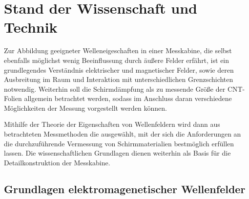 

\chapter{Stand der Wissenschaft und Technik}\label{cha:2}

Zur Abbildung geeigneter Welleneigeschaften in einer Messkabine, die selbst ebenfalls möglichst wenig Beeinflussung durch äußere Felder erfährt, ist ein grundlegendes Verständnis elektrischer und magnetischer Felder, sowie deren Ausbreitung im Raum und Interaktion mit unterschiedlichen Grenzschichten notwendig. Weiterhin soll die Schirmdämpfung als zu messende Größe der CNT-Folien allgemein betrachtet werden, sodass im Anschluss daran verschiedene Möglichkeiten der Messung vorgestellt werden können. \par
\vspace{\linespace}
Mithilfe der Theorie der Eigenschaften von Wellenfeldern wird dann aus betrachteten Messmethoden die ausgewählt, mit der sich die Anforderungen an die durchzuführende Vermessung von Schirmmaterialien bestmöglich erfüllen lassen. Die wissenschaftlichen Grundlagen dienen weiterhin als Basis für die Detailkonstruktion der Messkabine.


\section{Grundlagen elektromagenetischer Wellenfelder}\label{cha:2_Grundlagen}

